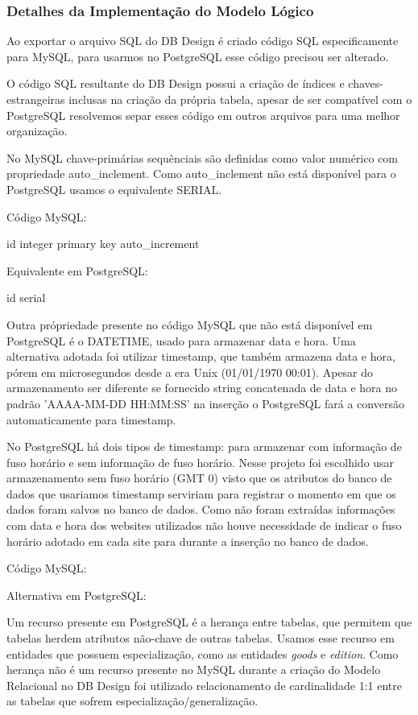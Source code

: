 \documentclass[12pt]{article}
\begin{document}
\subsubsection{Detalhes da Implementação do Modelo Lógico}

Ao exportar o arquivo SQL do DB Design é criado código SQL especificamente para MySQL, para usarmos no PostgreSQL esse código precisou ser alterado.

O código SQL resultante do DB Design possui a criação de índices e chaves-estrangeiras inclusas na criação da própria tabela, apesar de ser compatível com o PostgreSQL resolvemos separ esses código em outros arquivos para uma melhor organização.

No MySQL chave-primárias sequênciais são definidas como valor numérico com propriedade auto\_inclement. Como auto\_inclement não está disponível para o PostgreSQL usamos o equivalente SERIAL.

Código MySQL:

id integer primary key auto\_increment

Equivalente em PostgreSQL:

id serial

Outra própriedade presente no código MySQL que não está disponível em PostgreSQL é o DATETIME, usado para armazenar data e hora. Uma alternativa adotada foi utilizar timestamp, que também armazena data e hora, pórem em microsegundos desde a era Unix (01/01/1970 00:01). Apesar do armazenamento ser diferente se fornecido string concatenada de data e hora no padrão 'AAAA-MM-DD HH:MM:SS' na inserção o PostgreSQL fará a conversão automaticamente para timestamp. 

No PostgreSQL há dois tipos de timestamp: para armazenar com informação de fuso horário e sem informação de fuso horário. Nesse projeto foi escolhido usar armazenamento sem fuso horário (GMT 0) visto que os atributos do banco de dados que usariamos timestamp serviriam para registrar o momento em que os dados foram salvos no banco de dados. Como não foram extraídas informações com data e hora dos websites utilizados não houve necessidade de indicar o fuso horário adotado em cada site para durante a inserção no banco de dados.

Código MySQL:


Alternativa em PostgreSQL:



Um recurso presente em PostgreSQL é a herança entre tabelas, que permitem que tabelas herdem atributos não-chave de outras tabelas. Usamos esse recurso em entidades que possuem especialização, como as entidades \textit{goods} e \textit{edition}. Como herança não é um recurso presente no MySQL durante a criação do Modelo Relacional no DB Design foi utilizado relacionamento de cardinalidade 1:1 entre as tabelas que sofrem especialização/generalização.
\end{document}
